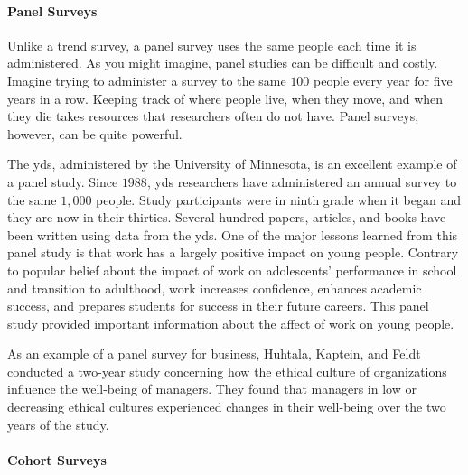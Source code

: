 \paragraph{Panel Surveys}

Unlike a trend survey, a panel survey uses the same people each time it is administered. As you might imagine, panel studies can be difficult and costly. Imagine trying to administer a survey to the same $ 100 $ people every year for five years in a row. Keeping track of where people live, when they move, and when they die takes resources that researchers often do not have. Panel surveys, however, can be quite powerful. 

The \gls{yds}\cite{uminn2018youth}, administered by the University of Minnesota, is an excellent example of a panel study. Since $ 1988 $, \gls{yds} researchers have administered an annual survey to the same $ 1,000 $ people. Study participants were in ninth grade when it began and they are now in their thirties. Several hundred papers, articles, and books have been written using data from the \gls{yds}. One of the major lessons learned from this panel study is that work has a largely positive impact on young people. Contrary to popular belief about the impact of work on adolescents' performance in school and transition to adulthood, work increases confidence, enhances academic success, and prepares students for success in their future careers. This panel study provided important information about the affect of work on young people.

As an example of a panel survey for business, Huhtala, Kaptein, and Feldt conducted a two-year study concerning how the ethical culture of organizations influence the well-being of managers\cite{huhtala2016perceived}. They found that managers in low or decreasing ethical cultures experienced changes in their well-being over the two years of the study.

\paragraph{Cohort Surveys}

